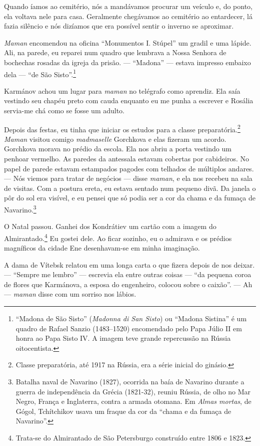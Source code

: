 Quando íamos ao cemitério, nós a mandávamos procurar um veículo e, do
ponto, ela voltava nele para casa. Geralmente chegávamos ao cemitério ao
entardecer, lá fazia silêncio e nós dizíamos que era possível sentir o
inverno se aproximar.

\emph{Maman} encomendou na oficina ``Monumentos I. Stúpel'' um gradil e
uma lápide. Ali, na parede, eu reparei num quadro que lembrava a Nossa
Senhora de bochechas rosadas da igreja da prisão. --- ``Madona'' ---
estava impresso embaixo dela --- ``de São Sisto''.\footnote{``Madona de
  São Sisto'' (\emph{Madonna di San Sisto}) ou ``Madona Sistina'' é um
  quadro de Rafael Sanzio (1483--1520) encomendado pelo Papa Júlio II em
  honra ao Papa Sisto IV. A imagem teve grande repercussão na Rússia
  oitocentista.}

Karmánov achou um lugar para \emph{maman} no telégrafo como aprendiz.
Ela saía vestindo seu chapéu preto com cauda enquanto eu me punha a
escrever e Rosália servia-me chá como se fosse um adulto.

Depois das festas, eu tinha que iniciar os estudos para a classe
preparatória.\footnote{Classe preparatória, até 1917 na Rússia, era a
  série inicial do ginásio.} \emph{Maman} visitou comigo
\emph{madmaselle} Gorchkova e elas fizeram um acordo. Gorchkova morava
no prédio da escola. Ela nos abriu a porta vestindo um penhoar vermelho.
As paredes da antessala estavam cobertas por cabideiros. No papel de
parede estavam estampados pagodes com telhados de múltiplos andares. ---
Nós viemos para tratar de negócios --- disse \emph{maman}, e ela nos
recebeu na sala de visitas. Com a postura ereta, eu estava sentado num
pequeno divã. Da janela o pôr do sol era visível, e eu pensei que só
podia ser a cor da chama e da fumaça de Navarino.\footnote{Batalha naval
  de Navarino (1827), ocorrida na baía de Navarino durante a guerra de
  independência da Grécia (1821-32), reuniu Rússia, de olho no Mar
  Negro, França e Inglaterra, contra a armada otomana. Em \emph{Almas
  mortas}, de Gógol, Tchítchikov usava um fraque da cor da ``chama e da
  fumaça de Navarino''.}

O Natal passou. Ganhei dos Kondrátiev um cartão com a imagem do
Almirantado.\footnote{Trata-se do Almirantado de São Petersburgo
  construído entre 1806 e 1823.} Eu gostei dele. Ao ficar sozinho, eu o
admirava e os prédios magníficos da cidade Ene desenhavam-se em minha
imaginação.

A dama de Vítebsk relatou em uma longa carta o que fizera depois de nos
deixar. --- ``Sempre me lembro'' --- escrevia ela entre outras coisas
--- ``da pequena coroa de flores que Karmánova, a esposa do engenheiro,
colocou sobre o caixão''. --- Ah --- \emph{maman} disse com um sorriso
nos lábios.

